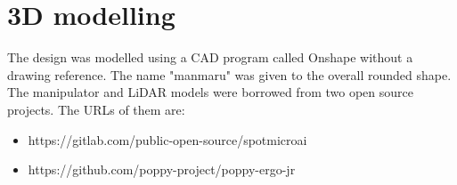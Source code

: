 \newpage
\appendix
\appendixpage
\addappheadtotoc


\section{3D modelling}

The design was modelled using a CAD program called Onshape without a drawing reference. The name "manmaru" was given to the overall rounded shape. The manipulator and LiDAR models were borrowed from two open source projects. The URLs of them are:

\begin{itemize}
\item https://gitlab.com/public-open-source/spotmicroai
\item https://github.com/poppy-project/poppy-ergo-jr
\end{itemize}

